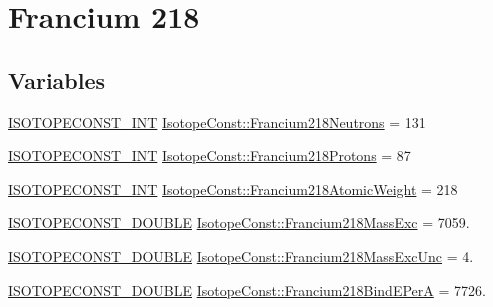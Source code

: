 \hypertarget{group___isotope_const-_francium-_fr218}{}\section{Francium 218}
\label{group___isotope_const-_francium-_fr218}
\subsection*{Variables}
\begin{DoxyCompactItemize}
\item 
\mbox{\hyperlink{group___isotope_const-_macros_ga5f18360b3e99483a35c32d789e62621c}{I\+S\+O\+T\+O\+P\+E\+C\+O\+N\+S\+T\+\_\+\+I\+NT}} \mbox{\hyperlink{group___isotope_const-_francium-_fr218_gaa8350820ac25bf0923c92bce5bd2105d}{Isotope\+Const\+::\+Francium218\+Neutrons}} = 131
\item 
\mbox{\hyperlink{group___isotope_const-_macros_ga5f18360b3e99483a35c32d789e62621c}{I\+S\+O\+T\+O\+P\+E\+C\+O\+N\+S\+T\+\_\+\+I\+NT}} \mbox{\hyperlink{group___isotope_const-_francium-_fr218_ga59f00fa51bbfa5ac3bf0f529fe4a8252}{Isotope\+Const\+::\+Francium218\+Protons}} = 87
\item 
\mbox{\hyperlink{group___isotope_const-_macros_ga5f18360b3e99483a35c32d789e62621c}{I\+S\+O\+T\+O\+P\+E\+C\+O\+N\+S\+T\+\_\+\+I\+NT}} \mbox{\hyperlink{group___isotope_const-_francium-_fr218_ga05dc946745aa98a440920b40cefcd539}{Isotope\+Const\+::\+Francium218\+Atomic\+Weight}} = 218
\item 
\mbox{\hyperlink{group___isotope_const-_macros_ga8f45a7272ce02c0b4c65c44636ed719a}{I\+S\+O\+T\+O\+P\+E\+C\+O\+N\+S\+T\+\_\+\+D\+O\+U\+B\+LE}} \mbox{\hyperlink{group___isotope_const-_francium-_fr218_gad1ed42789953c7376c4ac5dfa8a4dcb3}{Isotope\+Const\+::\+Francium218\+Mass\+Exc}} = 7059.
\item 
\mbox{\hyperlink{group___isotope_const-_macros_ga8f45a7272ce02c0b4c65c44636ed719a}{I\+S\+O\+T\+O\+P\+E\+C\+O\+N\+S\+T\+\_\+\+D\+O\+U\+B\+LE}} \mbox{\hyperlink{group___isotope_const-_francium-_fr218_ga997af7645604fc9544c92198fce5e14c}{Isotope\+Const\+::\+Francium218\+Mass\+Exc\+Unc}} = 4.
\item 
\mbox{\hyperlink{group___isotope_const-_macros_ga8f45a7272ce02c0b4c65c44636ed719a}{I\+S\+O\+T\+O\+P\+E\+C\+O\+N\+S\+T\+\_\+\+D\+O\+U\+B\+LE}} \mbox{\hyperlink{group___isotope_const-_francium-_fr218_ga2113b4d9cf119500ddb183d531897a3a}{Isotope\+Const\+::\+Francium218\+Bind\+E\+PerA}} = 7726.
\item 

\end{DoxyCompactItemize}
